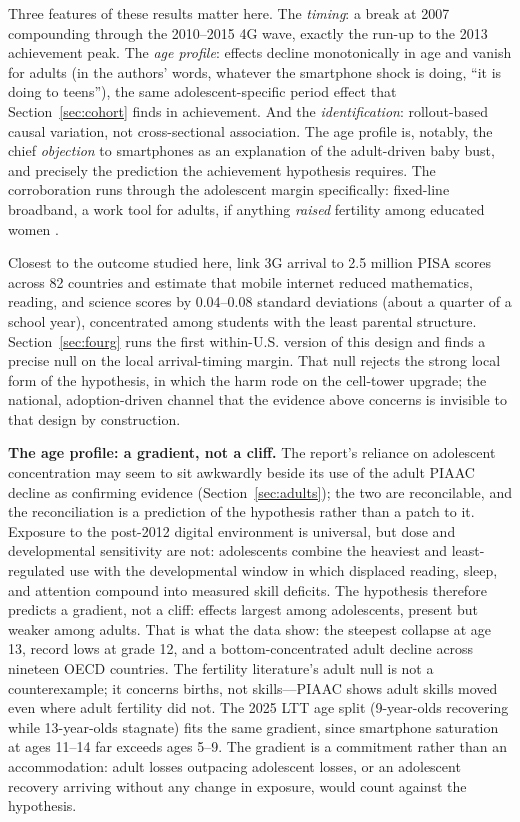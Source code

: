 \documentclass[11pt]{article}
\begin{document}
Three features of these results matter here. The \emph{timing}: a break at 2007 compounding through the 2010--2015 4G wave, exactly the run-up to the 2013 achievement peak. The \emph{age profile}: effects decline monotonically in age and vanish for adults (in the authors' words, whatever the smartphone shock is doing, ``it is doing to teens''), the same adolescent-specific period effect that Section~\ref{sec:cohort} finds in achievement. And the \emph{identification}: rollout-based causal variation, not cross-sectional association. The age profile is, notably, the chief \emph{objection} to smartphones as an explanation of the adult-driven baby bust, and precisely the prediction the achievement hypothesis requires. The corroboration runs through the adolescent margin specifically: fixed-line broadband, a work tool for adults, if anything \emph{raised} fertility among educated women \citep{billari2019}.

Closest to the outcome studied here, \citet{jainstemper2024} link 3G arrival to 2.5 million PISA scores across 82 countries and estimate that mobile internet reduced mathematics, reading, and science scores by 0.04--0.08 standard deviations (about a quarter of a school year), concentrated among students with the least parental structure. Section~\ref{sec:fourg} runs the first within-U.S. version of this design and finds a precise null on the local arrival-timing margin. That null rejects the strong local form of the hypothesis, in which the harm rode on the cell-tower upgrade; the national, adoption-driven channel that the evidence above concerns is invisible to that design by construction.

\textbf{The age profile: a gradient, not a cliff.} The report's reliance on adolescent concentration may seem to sit awkwardly beside its use of the adult PIAAC decline as confirming evidence (Section~\ref{sec:adults}); the two are reconcilable, and the reconciliation is a prediction of the hypothesis rather than a patch to it. Exposure to the post-2012 digital environment is universal, but dose and developmental sensitivity are not: adolescents combine the heaviest and least-regulated use with the developmental window in which displaced reading, sleep, and attention compound into measured skill deficits. The hypothesis therefore predicts a gradient, not a cliff: effects largest among adolescents, present but weaker among adults. That is what the data show: the steepest collapse at age 13, record lows at grade 12, and a bottom-concentrated adult decline across nineteen OECD countries. The fertility literature's adult null is not a counterexample; it concerns births, not skills---PIAAC shows adult skills moved even where adult fertility did not. The 2025 LTT age split (9-year-olds recovering while 13-year-olds stagnate) fits the same gradient, since smartphone saturation at ages 11--14 far exceeds ages 5--9. The gradient is a commitment rather than an accommodation: adult losses outpacing adolescent losses, or an adolescent recovery arriving without any change in exposure, would count against the hypothesis.
\end{document}
